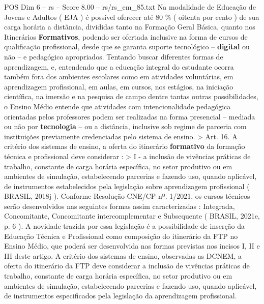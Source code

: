 \begin{textsample}{POS Dim 6 – rs – Score 8.00 – rs/rs\_em\_85.txt}
Na modalidade de Educação de Jovens e Adultos ( EJA ) é possível oferecer até 80 \% ( oitenta por cento ) de sua carga horária a distância, divididas tanto na Formação Geral Básica, quanto nos Itinerários \textbf{Formativos}, podendo ser ofertada inclusive na forma de cursos de qualificação profissional, desde que se garanta suporte tecnológico – \textbf{digital} ou não – e pedagógico apropriados.
Tentando buscar diferentes formas de aprendizagem, e, entendendo que a educação integral do estudante ocorra também fora dos ambientes escolares como em atividades voluntárias, em aprendizagem profissional, em aulas, em cursos, nos estágios, na iniciação científica, na imersão e na pesquisa de campo dentre tantas outras possibilidades, o Ensino Médio entende que atividades com intencionalidade pedagógica orientadas pelos professores podem ser realizadas na forma presencial – mediada ou não por \textbf{tecnologia} – ou a distância, inclusive sob regime de parceria com instituições previamente credenciadas pelo sistema de ensino. > Art. 16.
A critério dos sistemas de ensino, a oferta do itinerário \textbf{formativo} da formação técnica e profissional deve considerar : > I - a inclusão de vivências práticas de trabalho, constante de carga horária específica, no setor produtivo ou em ambientes de simulação, estabelecendo parcerias e fazendo uso, quando aplicável, de instrumentos estabelecidos pela legislação sobre aprendizagem profissional ( BRASIL, 2018j ).
Conforme Resolução CNE/CP nº. 1/2021, os cursos técnicos serão desenvolvidos nas seguintes formas assim caracterizadas : Integrada, Concomitante, Concomitante intercomplementar e Subsequente ( BRASIL, 2021e, p. 6 ).
A novidade trazida por essa legislação é a possibilidade de inserção da Educação Técnica e Profissional como composição do itinerário da FTP no Ensino Médio, que poderá ser desenvolvida nas formas previstas nos incisos I, II e III deste artigo.
A critério dos sistemas de ensino, observadas as DCNEM, a oferta do itinerário da FTP deve considerar a inclusão de vivências práticas de trabalho, constante de carga horária específica, no setor produtivo ou em ambientes de simulação, estabelecendo parcerias e fazendo uso, quando aplicável, de instrumentos especificados pela legislação da aprendizagem profissional.

\end{textsample}
